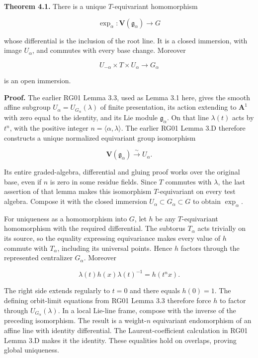 \documentclass[11pt,a4paper,openany]{report}
\begin{document}
\textbf{Theorem 4.1.} There is a unique \(T\)-equivariant homomorphism

\[
\exp_\alpha:\mathbf V(\mathfrak g_\alpha)\longrightarrow G
\]

whose differential is the inclusion of the root line. It is a closed immersion, with image \(U_\alpha\), and commutes with every base change. Moreover

\[
U_{-\alpha}\times T\times U_\alpha\longrightarrow G_\alpha
\]

is an open immersion.

\textbf{Proof.} The earlier RG01 Lemma 3.3, used as Lemma 3.1 here, gives the smooth affine subgroup \(U_\alpha=U_{G_\alpha}(\lambda)\) of finite presentation, its action extending to \(\mathbf A^1\) with zero equal to the identity, and its Lie module \(\mathfrak g_\alpha\). On that line \(\lambda(t)\) acts by \(t^n\), with the positive integer \(n=\langle\alpha,\lambda\rangle\). The earlier RG01 Lemma 3.D therefore constructs a unique normalized equivariant group isomorphism

\[
\mathbf V(\mathfrak g_\alpha)\xrightarrow{\sim}U_\alpha.
\]

Its entire graded-algebra, differential and gluing proof works over the original base, even if \(n\) is zero in some residue fields. Since \(T\) commutes with \(\lambda\), the last assertion of that lemma makes this isomorphism \(T\)-equivariant on every test algebra. Compose it with the closed immersion \(U_\alpha\subset G_\alpha\subset G\) to obtain \(\exp_\alpha\).

For uniqueness as a homomorphism into \(G\), let \(h\) be any \(T\)-equivariant homomorphism with the required differential. The subtorus \(T_\alpha\) acts trivially on its source, so the equality expressing equivariance makes every value of \(h\) commute with \(T_\alpha\), including its universal points. Hence \(h\) factors through the represented centralizer \(G_\alpha\). Moreover

\[
\lambda(t)h(x)\lambda(t)^{-1}=h(t^n x).
\]

The right side extends regularly to \(t=0\) and there equals \(h(0)=1\). The defining orbit-limit equations from RG01 Lemma 3.3 therefore force \(h\) to factor through \(U_{G_\alpha}(\lambda)\). In a local Lie-line frame, compose with the inverse of the preceding isomorphism. The result is a weight-\(n\) equivariant endomorphism of an affine line with identity differential. The Laurent-coefficient calculation in RG01 Lemma 3.D makes it the identity. These equalities hold on overlaps, proving global uniqueness.
\end{document}
